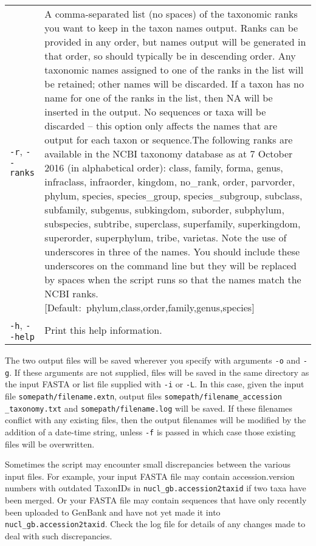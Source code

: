 \documentclass[11pt]{amsart}
\begin{document}
\begin{longtable}{@{} p{1.4in} p{5.35in} @{}}
      \verb|-r|, \verb|--ranks|  & A comma-separated list (no spaces) of the taxonomic ranks you want to keep in the taxon names output. Ranks can be provided in any order, but names output will be generated in that order, so should typically be in descending order. Any taxonomic names assigned to one of the ranks in the list will be retained; other names will be discarded. If a taxon has no name for one of the ranks in the list, then NA will be inserted in the output. No sequences or taxa will be discarded -- this option only affects the names that are output for each taxon or sequence.The following ranks are available in the NCBI taxonomy database as at 7 October 2016 (in alphabetical order): class, family, forma, genus, \mbox{infraclass}, \mbox{infraorder}, kingdom, no\_rank, order, parvorder, phylum, species, species\_group, species\_subgroup, subclass, subfamily, subgenus, \mbox{subkingdom}, \mbox{suborder}, \mbox{subphylum}, subspecies, subtribe, superclass, superfamily, \mbox{superkingdom}, \mbox{superorder}, superphylum, tribe, varietas. Note the use of underscores in three of the names. You should include these underscores on the command line but they will be replaced by spaces when the script runs so that the names match the NCBI ranks. \mbox{[Default:~phylum,class,order,family,genus,species]} \\
      \verb|-h|, \verb|--help| & Print this help information.
\end{longtable}

The two output files will be saved wherever you specify with arguments \verb|-o| and \verb|-g|. If these arguments are not supplied, files will be saved in the same directory as the input FASTA or list file supplied with \verb|-i| or \verb|-L|. In this case, given the input file \verb|somepath/filename.extn|, output files \verb|somepath/filename_accession| \verb|_taxonomy.txt| and \verb|somepath/filename.log| will be saved. If these filenames conflict with any existing files, then the output filenames will be modified by the addition of a date-time string, unless \verb|-f| is passed in which case those existing files will be overwritten.

Sometimes the script may encounter small discrepancies between the various input files. For example, your input FASTA file may contain accession.version numbers with outdated TaxonIDs in \verb|nucl_gb.accession2taxid| if two taxa have been merged. Or your FASTA file may contain sequences that have only recently been uploaded to GenBank and have not yet made it into \verb|nucl_gb.accession2taxid|. Check the log file for details of any changes made to deal with such discrepancies.
\end{document}
